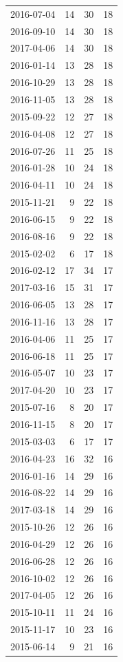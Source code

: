 \begin{tabular}{lrrr}
2016-07-04 & 14 & 30 & 18 \\
2016-09-10 & 14 & 30 & 18 \\
2017-04-06 & 14 & 30 & 18 \\
2016-01-14 & 13 & 28 & 18 \\
2016-10-29 & 13 & 28 & 18 \\
2016-11-05 & 13 & 28 & 18 \\
2015-09-22 & 12 & 27 & 18 \\
2016-04-08 & 12 & 27 & 18 \\
2016-07-26 & 11 & 25 & 18 \\
2016-01-28 & 10 & 24 & 18 \\
2016-04-11 & 10 & 24 & 18 \\
2015-11-21 & 9 & 22 & 18 \\
2016-06-15 & 9 & 22 & 18 \\
2016-08-16 & 9 & 22 & 18 \\
2015-02-02 & 6 & 17 & 18 \\
2016-02-12 & 17 & 34 & 17 \\
2017-03-16 & 15 & 31 & 17 \\
2016-06-05 & 13 & 28 & 17 \\
2016-11-16 & 13 & 28 & 17 \\
2016-04-06 & 11 & 25 & 17 \\
2016-06-18 & 11 & 25 & 17 \\
2016-05-07 & 10 & 23 & 17 \\
2017-04-20 & 10 & 23 & 17 \\
2015-07-16 & 8 & 20 & 17 \\
2016-11-15 & 8 & 20 & 17 \\
2015-03-03 & 6 & 17 & 17 \\
2016-04-23 & 16 & 32 & 16 \\
2016-01-16 & 14 & 29 & 16 \\
2016-08-22 & 14 & 29 & 16 \\
2017-03-18 & 14 & 29 & 16 \\
2015-10-26 & 12 & 26 & 16 \\
2016-04-29 & 12 & 26 & 16 \\
2016-06-28 & 12 & 26 & 16 \\
2016-10-02 & 12 & 26 & 16 \\
2017-04-05 & 12 & 26 & 16 \\
2015-10-11 & 11 & 24 & 16 \\
2015-11-17 & 10 & 23 & 16 \\
2015-06-14 & 9 & 21 & 16 \\

\end{tabular}
